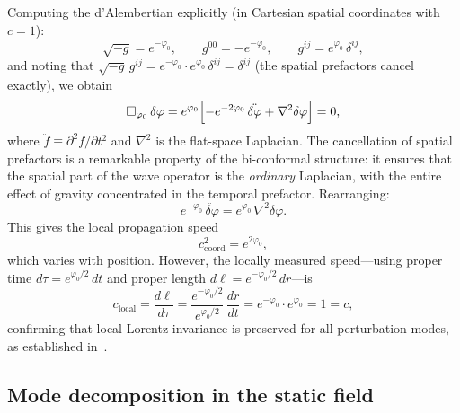 \documentclass[aps,prd,onecolumn,superscriptaddress,nofootinbib,showpacs,12pt,notitlepage]{revtex4-2}
\begin{document}
Computing the d'Alembertian explicitly (in Cartesian spatial
coordinates with $c = 1$):
\begin{equation}
  \sqrt{-g} = e^{-\varphi_0}, \qquad
  g^{00} = -e^{-\varphi_0}, \qquad
  g^{ij} = e^{\varphi_0}\,\delta^{ij},
\end{equation}
and noting that $\sqrt{-g}\,g^{ij} = e^{-\varphi_0}\cdot
e^{\varphi_0}\,\delta^{ij} = \delta^{ij}$
(the spatial prefactors cancel exactly), we obtain
\begin{equation}\label{eq:box_explicit}
  \Box_{\varphi_0}\,\delta\varphi
  = e^{\varphi_0}\Bigl[
    -e^{-2\varphi_0}\,\ddot{\delta\varphi}
    + \nabla^{2}\delta\varphi
  \Bigr] = 0,
\end{equation}
where $\ddot{f} \equiv \partial^2 f/\partial t^2$ and
$\nabla^2$ is the flat-space Laplacian.  The cancellation
of spatial prefactors is a remarkable property of the
bi-conformal structure: it ensures that the spatial part
of the wave operator is the \emph{ordinary} Laplacian,
with the entire effect of gravity concentrated in the
temporal prefactor.  Rearranging:
\begin{equation}\label{eq:wave_rearranged}
  \boxed{
  e^{-\varphi_0}\,\ddot{\delta\varphi}
  = e^{\varphi_0}\,\nabla^{2}\delta\varphi.
  }
\end{equation}
This gives the local propagation speed
\begin{equation}\label{eq:c_coord}
  c_{\mathrm{coord}}^{2} = e^{2\varphi_0},
\end{equation}
which varies with position.  However, the locally measured
speed---using proper time $d\tau = e^{\varphi_0/2}\,dt$ and
proper length $d\ell = e^{-\varphi_0/2}\,dr$---is
\begin{equation}\label{eq:c_local}
  c_{\mathrm{local}} = \frac{d\ell}{d\tau}
  = \frac{e^{-\varphi_0/2}}{e^{\varphi_0/2}}\,
    \frac{dr}{dt}
  = e^{-\varphi_0}\cdot e^{\varphi_0} = 1 = c,
\end{equation}
confirming that local Lorentz invariance is preserved for
all perturbation modes, as established in~\cite{Lotishvili2026}.

\subsection{Mode decomposition in the static field}
\label{sec:modes}
\end{document}
